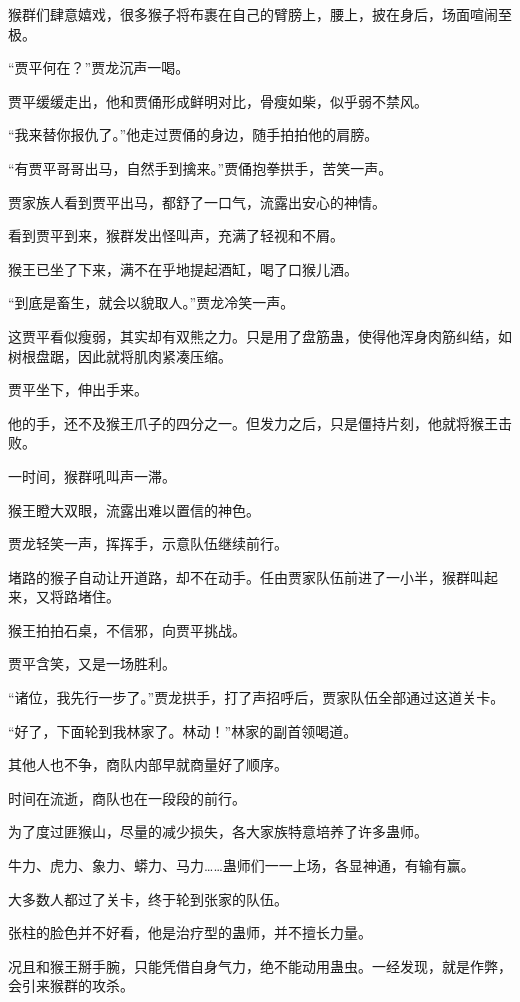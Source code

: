\begin{this_body}
猴群们肆意嬉戏，很多猴子将布裹在自己的臂膀上，腰上，披在身后，场面喧闹至极。

“贾平何在？”贾龙沉声一喝。

贾平缓缓走出，他和贾俑形成鲜明对比，骨瘦如柴，似乎弱不禁风。

“我来替你报仇了。”他走过贾俑的身边，随手拍拍他的肩膀。

“有贾平哥哥出马，自然手到擒来。”贾俑抱拳拱手，苦笑一声。

贾家族人看到贾平出马，都舒了一口气，流露出安心的神情。

看到贾平到来，猴群发出怪叫声，充满了轻视和不屑。

猴王已坐了下来，满不在乎地提起酒缸，喝了口猴儿酒。

“到底是畜生，就会以貌取人。”贾龙冷笑一声。

这贾平看似瘦弱，其实却有双熊之力。只是用了盘筋蛊，使得他浑身肉筋纠结，如树根盘踞，因此就将肌肉紧凑压缩。

贾平坐下，伸出手来。

他的手，还不及猴王爪子的四分之一。但发力之后，只是僵持片刻，他就将猴王击败。

一时间，猴群吼叫声一滞。

猴王瞪大双眼，流露出难以置信的神色。

贾龙轻笑一声，挥挥手，示意队伍继续前行。

堵路的猴子自动让开道路，却不在动手。任由贾家队伍前进了一小半，猴群叫起来，又将路堵住。

猴王拍拍石桌，不信邪，向贾平挑战。

贾平含笑，又是一场胜利。

“诸位，我先行一步了。”贾龙拱手，打了声招呼后，贾家队伍全部通过这道关卡。

“好了，下面轮到我林家了。林动！”林家的副首领喝道。

其他人也不争，商队内部早就商量好了顺序。

时间在流逝，商队也在一段段的前行。

为了度过匪猴山，尽量的减少损失，各大家族特意培养了许多蛊师。

牛力、虎力、象力、蟒力、马力……蛊师们一一上场，各显神通，有输有赢。

大多数人都过了关卡，终于轮到张家的队伍。

张柱的脸色并不好看，他是治疗型的蛊师，并不擅长力量。

况且和猴王掰手腕，只能凭借自身气力，绝不能动用蛊虫。一经发现，就是作弊，会引来猴群的攻杀。


\end{this_body}
